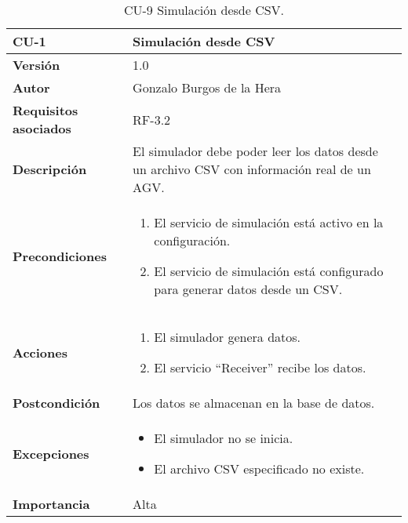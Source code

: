 \begin{table}[H]
	\centering
	\begin{tabularx}{\linewidth}{ p{} p{} }
		\toprule
		\textbf{CU-1}    & \textbf{Simulación desde CSV}\\
		\toprule
		\textbf{Versión}              & 1.0    \\
		\textbf{Autor}                & Gonzalo Burgos de la Hera \\
		\textbf{Requisitos asociados} & RF-3.2 \\
		\textbf{Descripción}          & El simulador debe poder leer los datos desde un archivo CSV con información real de un AGV. \\
		\textbf{Precondiciones}       & 
        \begin{enumerate}
			\def\labelenumi{\arabic{enumi}.}
			\tightlist
			\item El servicio de simulación está activo en la configuración.
			\item El servicio de simulación está configurado para generar datos desde un CSV.
		\end{enumerate}\\
		\textbf{Acciones}             &
		\begin{enumerate}
			\def\labelenumi{\arabic{enumi}.}
			\tightlist
			\item El simulador genera datos.
			\item El servicio ``Receiver'' recibe los datos.
		\end{enumerate}\\
		\textbf{Postcondición}        & Los datos se almacenan en la base de datos. \\
		\textbf{Excepciones}          & 
        \begin{itemize}
			\tightlist
			\item El simulador no se inicia.
			\item El archivo CSV especificado no existe.
        \end{itemize} \\
		\textbf{Importancia}          & Alta \\
		\bottomrule
	\end{tabularx}
	\caption{CU-9 Simulación desde CSV.}
\end{table}

